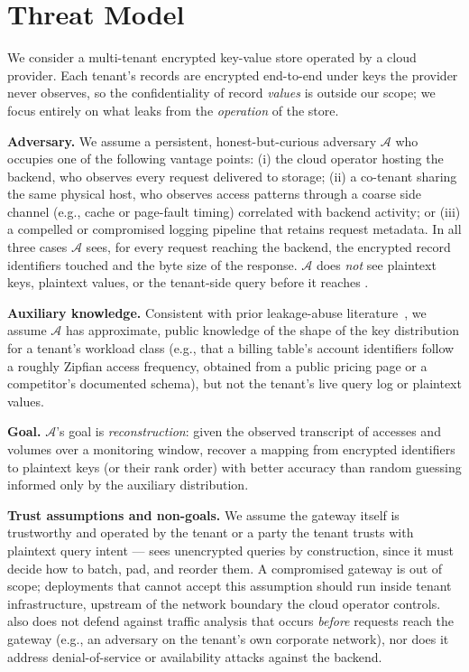 \section{Threat Model}
\label{sec:threat-model}

We consider a multi-tenant encrypted key-value store operated by a cloud
provider. Each tenant's records are encrypted end-to-end under keys the
provider never observes, so the confidentiality of record \emph{values} is
outside our scope; we focus entirely on what leaks from the
\emph{operation} of the store.

\smallskip
\noindent\textbf{Adversary.} We assume a persistent, honest-but-curious
adversary $\mathcal{A}$ who occupies one of the following vantage points:
(i) the cloud operator hosting the backend, who observes every request
delivered to storage; (ii) a co-tenant sharing the same physical host, who
observes access patterns through a coarse side channel (e.g., cache or
page-fault timing) correlated with backend activity; or (iii) a compelled
or compromised logging pipeline that retains request metadata. In all
three cases $\mathcal{A}$ sees, for every request reaching the backend, the
encrypted record identifiers touched and the byte size of the response.
$\mathcal{A}$ does \emph{not} see plaintext keys, plaintext values, or the
tenant-side query before it reaches \sysname{}.

\smallskip
\noindent\textbf{Auxiliary knowledge.} Consistent with prior leakage-abuse
literature~\cite{kellaris2016generic,grubbs2018pumpup}, we assume
$\mathcal{A}$ has approximate, public knowledge of the shape of the key
distribution for a tenant's workload class (e.g., that a billing table's
account identifiers follow a roughly Zipfian access frequency, obtained
from a public pricing page or a competitor's documented schema), but not
the tenant's live query log or plaintext values.

\smallskip
\noindent\textbf{Goal.} $\mathcal{A}$'s goal is \emph{reconstruction}: given
the observed transcript of accesses and volumes over a monitoring window,
recover a mapping from encrypted identifiers to plaintext keys (or their
rank order) with better accuracy than random guessing informed only by the
auxiliary distribution.

\smallskip
\noindent\textbf{Trust assumptions and non-goals.} We assume the
\sysname{} gateway itself is trustworthy and operated by the tenant or a
party the tenant trusts with plaintext query intent --- \sysname{} sees
unencrypted queries by construction, since it must decide how to batch,
pad, and reorder them. A compromised gateway is out of scope; deployments
that cannot accept this assumption should run \sysname{} inside tenant
infrastructure, upstream of the network boundary the cloud operator
controls. \sysname{} also does not defend against traffic analysis that
occurs \emph{before} requests reach the gateway (e.g., an adversary on the
tenant's own corporate network), nor does it address denial-of-service or
availability attacks against the backend.
